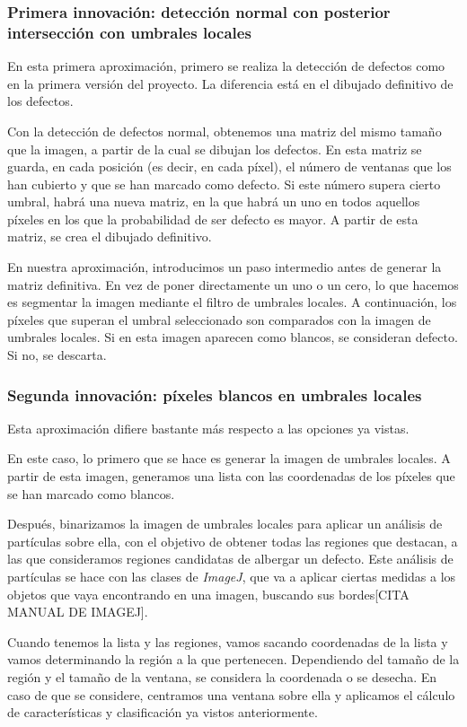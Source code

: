 \subsubsection{Primera innovación: detección normal con posterior intersección con umbrales locales}
En esta primera aproximación, primero se realiza la detección de defectos como en la primera versión del proyecto. La diferencia está en el dibujado definitivo de los defectos.

Con la detección de defectos normal, obtenemos una matriz del mismo tamaño que la imagen, a partir de la cual se dibujan los defectos. En esta matriz se guarda, en cada posición (es decir, en cada píxel), el número de ventanas que los han cubierto y que se han marcado como defecto. Si este número supera cierto umbral, habrá una nueva matriz, en la que habrá un uno en todos aquellos píxeles en los que la probabilidad de ser defecto es mayor. A partir de esta matriz, se crea el dibujado definitivo.

En nuestra aproximación, introducimos un paso intermedio antes de generar la matriz definitiva. En vez de poner directamente un uno o un cero, lo que hacemos es segmentar la imagen mediante el filtro de umbrales locales. A continuación, los píxeles que superan el umbral seleccionado son comparados con la imagen de umbrales locales. Si en esta imagen aparecen como blancos, se consideran defecto. Si no, se descarta.

\subsubsection{Segunda innovación: píxeles blancos en umbrales locales}
Esta aproximación difiere bastante más respecto a las opciones ya vistas.

En este caso, lo primero que se hace es generar la imagen de umbrales locales. A partir de esta imagen, generamos una lista con las coordenadas de los píxeles que se han marcado como blancos.

Después, binarizamos la imagen de umbrales locales para aplicar un análisis de partículas sobre ella, con el objetivo de obtener todas las regiones que destacan, a las que consideramos regiones candidatas de albergar un defecto. Este análisis de partículas se hace con las clases de \emph{ImageJ}, que va a aplicar ciertas medidas a los objetos que vaya encontrando en una imagen, buscando sus bordes[CITA MANUAL DE IMAGEJ].

Cuando tenemos la lista y las regiones, vamos sacando coordenadas de la lista y vamos determinando la región a la que pertenecen. Dependiendo del tamaño de la región y el tamaño de la ventana, se considera la coordenada o se desecha. En caso de que se considere, centramos una ventana sobre ella y aplicamos el cálculo de características y clasificación ya vistos anteriormente.

